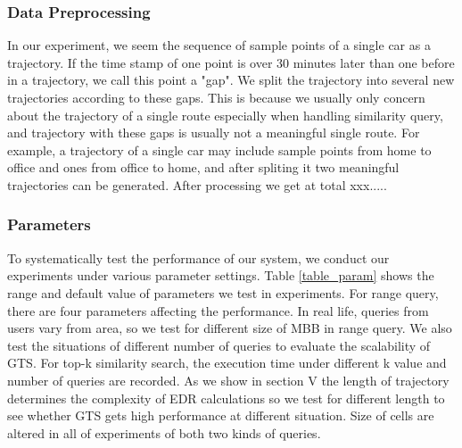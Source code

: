 \documentclass[conference]{IEEEtran}
\begin{document}
\subsubsection{Data Preprocessing}
In our experiment, we seem the sequence of sample points of a single car as a trajectory. If the time stamp of one point is over 30 minutes later than one before in a trajectory, we call this point a "gap". We split the trajectory into several new trajectories according to these gaps. This is because we usually only concern about the trajectory of a single route especially when handling similarity query, and trajectory with these gaps is usually not a meaningful single route. For example, a trajectory of a single car may include sample points from home to office and ones from office to home, and after spliting it two meaningful trajectories can be generated. After processing we get at total xxx.....



\subsubsection{Parameters}

To systematically test the performance of our system, we conduct our experiments under various parameter settings. Table \ref{table_param} shows the range and default value of parameters we test in experiments. For range query, there are four parameters affecting the performance. In real life, queries from users vary from area, so we test for different size of MBB in range query. We also test the situations of different number of queries to evaluate the scalability of GTS. For top-k similarity search, the execution time under different k value and number of queries are recorded. As we show in section V the length of trajectory determines the complexity of EDR calculations so we test for different length to see whether GTS gets high performance at different situation. Size of cells are altered in all of experiments of both two kinds of queries.
\end{document}
